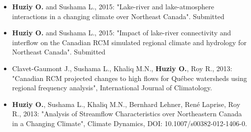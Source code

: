 \vspace{\vertspace}


{
\renewcommand{\labelitemi}{}
\begin{itemize}

    \item \textbf{Huziy O.} and Sushama L., 2015: "Lake-river and lake-atmosphere interactions in a changing climate over Northeast Canada". Submitted

    \item \textbf{Huziy O.} and Sushama L., 2015: "Impact of lake-river connectivity and interflow on the Canadian RCM simulated regional climate and hydrology for Northeast Canada". Submitted

    \item Clavet-Gaumont J., Sushama L., Khaliq M.N.,
    \textbf{Huziy O.}, Roy R., 2013: "Canadian RCM projected changes to high
    flows for Québec watersheds using regional frequency analysis", International Journal of Climatology.

    \item \textbf{Huziy O.}, Sushama L., Khaliq M.N., Bernhard
    Lehner, René Laprise, Roy R., 2013: "Analysis of Streamflow Characteristics over Northeastern Canada
     in a Changing Climate", Climate Dynamics, DOI:
     10.1007/s00382-012-1406-0.

\end{itemize}
}
